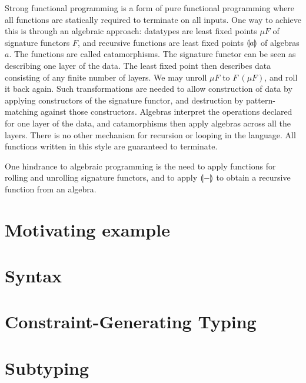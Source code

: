 \documentclass[runningheads]{llncs}
\begin{document}
Strong functional programming is a form of pure functional programming
where all functions are statically required to terminate on all
inputs.  One way to achieve this is through an algebraic approach:
datatypes are least fixed points $\mu F$ of signature functors $F$,
and recursive functions are least fixed points $\llparenthesis a \rrparenthesis$ of algebras
$a$.  The functions are called catamorphisms.  The signature functor
can be seen as describing one layer of the data.  The least fixed
point then describes data consisting of any finite number of layers.
We may unroll $\mu F$ to $F\ (\mu F)$, and roll it back again.  Such
transformations are needed to allow construction of data by applying
constructors of the signature functor, and destruction by
pattern-matching against those constructors.  Algebras interpret the
operations declared for one layer of the data, and catamorphisms then
apply algebras across all the layers.  There is no other mechanism for
recursion or looping in the language.  All functions written in this
style are guaranteed to terminate.

One hindrance to algebraic programming is the need to apply functions
for rolling and unrolling signature functors, and to apply $\llparenthesis - \rrparenthesis$
to obtain a recursive function from an algebra.


\section{Motivating example} %

%
%
%

\section{Syntax} %

\section{Constraint-Generating Typing} %

\section{Subtyping} %
\end{document}
